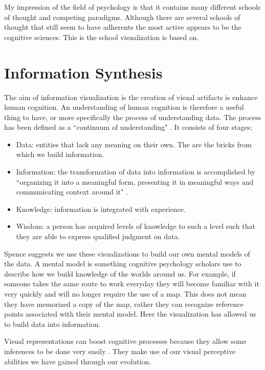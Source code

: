 \documentclass[a4paper, 10pt, titlepage, twocolumn]{article}
\begin{document}
My impression of the field of psychology is that it contains many different schools of thought and competing paradigms. Although there are several schools of thought that still seem to have adherents the most active appears to be the cognitive sciences. This is the school visualization is based on.

\section{Information Synthesis}
The aim of information visualization is the creation of visual artifacts is enhance human cognition. An understanding of human cognition is therefore a useful thing to have, or more specifically the process of understanding data. The process has been defined as a ``continuum of understanding" \cite{jacobson1999information}. It consists of four stages;
\begin{itemize}
\item Data: entities that lack any meaning on their own. The are the bricks from which we build information.
\item Information: the transformation of data into information is accomplished by ``organizing it into a meaningful form, presenting it in meaningful ways and communicating context around it" \cite{jacobson1999information}.
\item Knowledge: information is integrated with experience.
\item Wisdom: a person has acquired levels of knowledge to such a level such that they are able to express qualified judgment on data.
\end{itemize}

Spence \cite{spence2001information} suggests we use these visualizations to build our own mental models of the data. A mental model is something cognitive psychology scholars use to describe how we build knowledge of the worlds around us. For example, if someone takes the same route to work everyday they will become familiar with it very quickly and will no longer require the use of a map. This does not mean they have memorized a copy of the map, rather they can recognize reference points associated with their mental model. Here the visualization has allowed us to build data into information.


Visual representations can boost cognitive processes because they allow some inferences to be done very easily \cite{card1999readings}. They make use of our visual perceptive abilities we have gained through our evolution.
\end{document}
